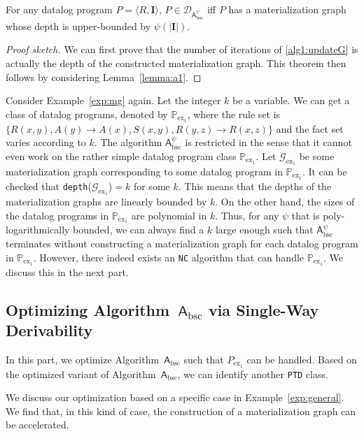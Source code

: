 \begin{theorem}\label{theorem:a1}
For any datalog program $P=\langle R, \textbf{I}\rangle$, $P\in\mathcal{D}_{\mathsf{A}_{\text{bsc}}^{\psi}}$ iff $P$ has a
materialization graph whose depth is upper-bounded by $\psi(|\textbf{I}|)$.
\end{theorem}

\begin{proof}[Proof sketch]
We can first prove that the number of iterations
of \ref{alg1:updateG} is actually the depth of the constructed materialization
graph. This theorem then follows by considering
Lemma~\ref{lemma:a1}.
\end{proof}

Consider Example~\ref{exp:mg} again. Let the integer $k$ be a variable. We can
get a class of datalog programs, denoted by $\mathbb{P}_{\text{ex}_1}$, where the rule set
is $\{R(x,y),A(y)\rightarrow A(x), S(x,y),R(y,z)\rightarrow R(x,z)\}$ and the fact
set varies according to $k$. The algorithm $\mathsf{A}_{\text{bsc}}^{\psi}$ is restricted in the sense that it cannot even work on the rather simple datalog program class $\mathbb{P}_{\text{ex}_1}$.
Let $\mathcal{G}_{\text{ex}_1}$ be some materialization graph corresponding
to some datalog program in $\mathbb{P}_{\text{ex}_1}$. It can be checked that
\texttt{depth}($\mathcal{G}_{\text{ex}_1}$)$=k$ for some $k$.
This means that the depths of the materialization graphs are linearly bounded by $k$.
On the other hand, the sizes of the datalog programs in $\mathbb{P}_{\text{ex}_1}$ are polynomial in $k$.
Thus, for any $\psi$ that is poly-logarithmically bounded, we can always find a $k$ large
enough such that $\mathsf{A}_{\text{bsc}}^{\psi}$ terminates without constructing a materialization
graph for each datalog program in $\mathbb{P}_{\text{ex}_1}$.
However, there indeed exists an \texttt{NC} algorithm that can handle $\mathbb{P}_{\text{ex}_1}$.
We discuss this in the next part.


\subsection{Optimizing Algorithm~$\mathsf{A}_{\text{bsc}}$ via Single-Way Derivability}
\label{sec:opt}

In this part, we optimize Algorithm~$\mathsf{A}_{\text{bsc}}$ such that $P_{\text{ex}_1}$
can be handled. Based on the optimized variant of Algorithm~$\mathsf{A}_{\text{bsc}}$,
we can identify another \texttt{PTD} class.

We discuss our optimization based on a specific case in Example~\ref{exp:general}.
We find that, in this kind of case, the construction of a materialization graph can be accelerated.

